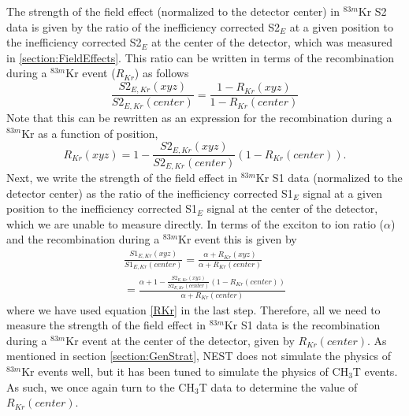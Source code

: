 The strength of the field effect (normalized to the detector center) in $^{83m}$Kr S2 data is given by the ratio of the inefficiency corrected S2$_E$ at a given position to the inefficiency corrected S2$_E$ at the center of the detector, which was measured in \ref{section:FieldEffects}.  This ratio can be written in terms of the recombination during a $^{83m}$Kr event ($R_{Kr}$) as follows
\begin{equation}
\frac{S2_{E,Kr}(xyz)}{S2_{E,Kr}(center)} = \frac{1-R_{Kr}(xyz)}{1-R_{Kr}(center)}
\end{equation}
Note that this can be rewritten as an expression for the recombination during a $^{83m}$Kr as a function of position,
\begin{equation} \label{RKr}
R_{Kr}(xyz) = 1- \frac{S2_{E,Kr}(xyz)}{S2_{E,Kr}(center)}(1-R_{Kr}(center)).
\end{equation}
Next, we write the strength of the field effect in $^{83m}$Kr S1 data (normalized to the detector center) as the ratio of the inefficiency corrected S1$_E$ signal at a given position to the inefficiency corrected S1$_E$ signal at the center of the detector, which we are unable to measure directly.  In terms of the exciton to ion ratio ($\alpha$) and the recombination during a $^{83m}$Kr event this is given by 
\begin{multline} \label{S1fieldstrength}
\frac{S1_{E,Kr}(xyz)}{S1_{E,Kr}(center)}=\frac{\alpha+R_{Kr}(xyz)}{\alpha+R_{Kr}(center)} \\ = \frac{\alpha + 1 - \frac{S2_{E,Kr}(xyz)}{S2_{E,Kr}(center)}(1-R_{Kr}(center))}{\alpha + R_{Kr}(center)}
\end{multline}
where we have used equation \ref{RKr} in the last step.  Therefore, all we need to measure the strength of the field effect in $^{83m}$Kr S1 data is the recombination during a $^{83m}$Kr event at the center of the detector, given by $R_{Kr}(center)$.  As mentioned in section \ref{section:GenStrat}, NEST does not simulate the physics of $^{83m}$Kr events well, but it has been tuned to simulate the physics of CH$_3$T events.  As such, we once again turn to the CH$_3$T data to determine the value of $R_{Kr}(center)$. 

